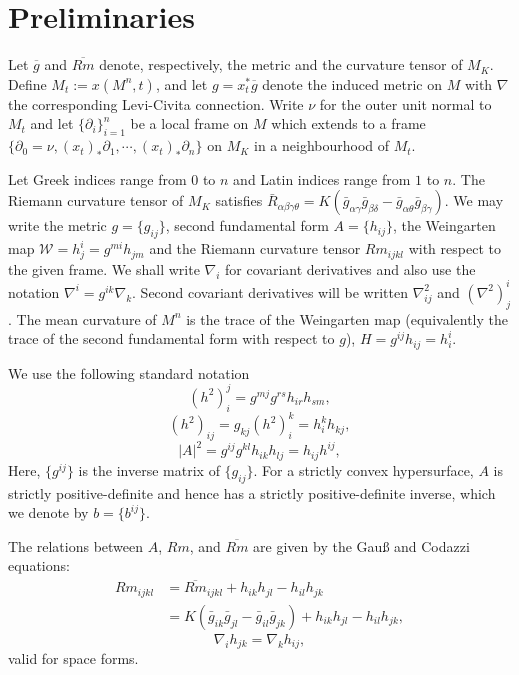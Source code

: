 \documentclass{amsart}
\theoremstyle{definition}
\theoremstyle{remark}
\numberwithin{equation}{section}
\begin{document}
\section{Preliminaries}

Let $\overline{g}$ and $\overline{Rm}$ denote, respectively, the metric and the curvature tensor of $M_K$. Define \(M_t := x(M^n,t)\), and let \(g = x_t^{\ast} \overline{g}\) denote the induced metric on \(M\) with $\nabla$ the corresponding Levi-Civita connection. Write $\nu$ for the outer unit normal to $M_t$ and let \(\{\partial_i\}_{i=1}^n\) be a local frame on \(M\) which extends to a frame \(\{\partial_0 = \nu, (x_t)_{\ast} \partial_1, \cdots, (x_t)_{\ast} \partial_n\}\) on \(M_K\) in a neighbourhood of \(M_t\). 

Let Greek indices range from \(0\) to \(n\) and Latin indices range from \(1\) to \(n\). The Riemann curvature tensor of \(M_K\) satisfies \(\bar{R}_{\alpha\beta\gamma\theta} = K(\bar{g}_{\alpha\gamma}\bar{g}_{\beta\delta} - \bar{g}_{\alpha\theta}\bar{g}_{\beta\gamma})\). We may write the metric $g = \{g_{ij}\}$, second fundamental form $A = \{h_{ij}\}$, the Weingarten map $\mathcal{W} = h^i_j = g^{mi} h_{jm}$ and the Riemann curvature tensor $Rm_{ijkl}$ with respect to the given frame. We shall write \(\nabla_i\) for covariant derivatives and also use the notation \(\nabla^i = g^{ik} \nabla_k\). Second covariant derivatives will be written \(\nabla^2_{ij}\) and \((\nabla^2)^i_j\). The mean curvature of $M^n$ is the trace of the Weingarten map (equivalently the trace of the second fundamental form with respect to $g$), $H = g^{ij}h_{ij} = h^i_i$.

We use the following standard notation
\[
(h^2)_i^j = g^{mj}g^{rs}h_{ir}h_{sm},
\]
\[
(h^2)_{ij} = g_{kj} (h^2)_i^k = h^k_i h_{kj},
\]
\[
|A|^2 = g^{ij}g^{kl}h_{ik}h_{lj} = h_{ij}h^{ij},
\]
Here, $\{g^{ij}\}$ is the inverse matrix of $\{g_{ij}\}.$ For a strictly convex hypersurface, \(A\) is strictly positive-definite and hence has a strictly positive-definite inverse, which we denote by \(b = \{b^{ij}\}\).

The relations between $A$, $Rm$, and $\overline{Rm}$ are given by the Gau{\ss} and Codazzi equations:
\[
\begin{split}
Rm_{ijkl} &= \overline{Rm}_{ijkl} + h_{ik}h_{jl} - h_{il}h_{jk} \\
&= K(\bar{g}_{ik}\bar{g}_{jl} - \bar{g}_{il}\bar{g}_{jk}) + h_{ik}h_{jl} - h_{il}h_{jk},
\end{split}
\]
\[
\nabla_i h_{jk} = \nabla_k h_{ij},
\]
valid for space forms.
\end{document}
